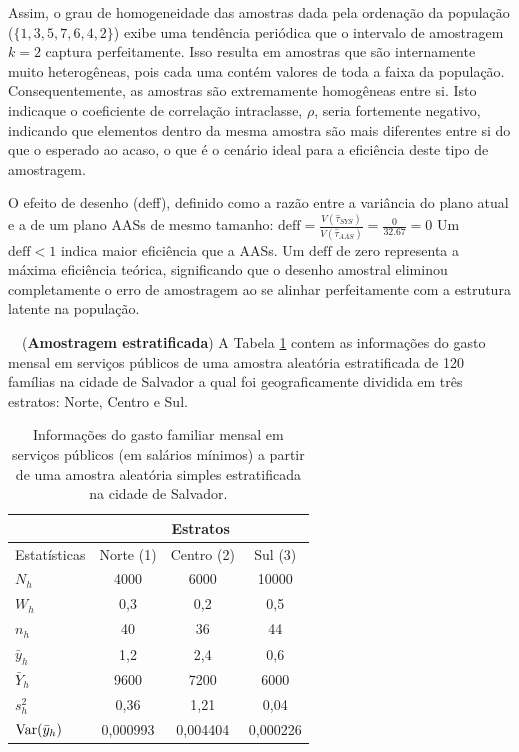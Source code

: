 \documentclass[a4paper,11pt,oneside,twocolumn]{Config/milktest}
\begin{document}
{		Assim, o grau de homogeneidade das amostras dada pela ordenação da população ($\{1, 3, 5, 7, 6, 4, 2\}$) exibe uma tendência periódica que o intervalo de amostragem $k=2$ captura perfeitamente. Isso resulta em amostras que são internamente muito heterogêneas, pois cada uma contém valores de toda a faixa da população. Consequentemente, as amostras são extremamente homogêneas entre si. Isto indicaque o coeficiente de correlação intraclasse, $\rho$, seria fortemente negativo, indicando que elementos dentro da mesma amostra são mais diferentes entre si do que o esperado ao acaso, o que é o cenário ideal para a eficiência deste tipo de amostragem.
		
		O efeito de desenho (deff), definido como a razão entre a variância do plano atual e a de um plano AASs de mesmo tamanho:
		$ \text{deff} = \frac{V(\hat{\tau}_{SYS})}{V(\hat{\tau}_{AAS})} = \frac{0}{32.67} = 0 $
		Um $\text{deff} < 1$ indica maior eficiência que a AASs. Um $\text{deff}$ de zero representa a máxima eficiência teórica, significando que o desenho amostral eliminou completamente o erro de amostragem ao se alinhar perfeitamente com a estrutura latente na população.
	}
	
	
	
	
	
	
	
	
	\medskip 
	\question~~({\bf Amostragem estratificada}) A Tabela \ref{tab:2} contem as informações do gasto mensal em serviços públicos de uma amostra aleatória estratificada de 120 famílias na cidade de Salvador a qual foi geograficamente dividida em três estratos: Norte, Centro e Sul.
	
	\begin{table}[!htb]
		\begin{tabular}{l|ccc}
			& \multicolumn{3}{c}{Estratos}   \\ \hline
			Estatísticas & Norte (1)   & Centro (2) & Sul (3)      \\ \hline
			$N_h$        & 4000     & 6000     & 10000    \\
			$W_h$        & 0,3      & 0,2      & 0,5      \\
			$n_h$        & 40       & 36       & 44       \\
			$\bar{y}_h$  & 1,2      & 2,4      & 0,6      \\
			$\bar{Y}_h$  & 9600     & 7200     & 6000     \\
			$s^2_h$             & 0,36     & 1,21     & 0,04     \\
			${\rm Var}(\bar{y}_h)$          & 0,000993 & 0,004404 & 0,000226 \\ \hline
		\end{tabular}
		\caption{Informações do gasto familiar mensal em serviços públicos (em salários mínimos) a partir de uma amostra aleatória simples estratificada na cidade de Salvador.}
		\label{tab:2}
	\end{table}
	
\end{document}
